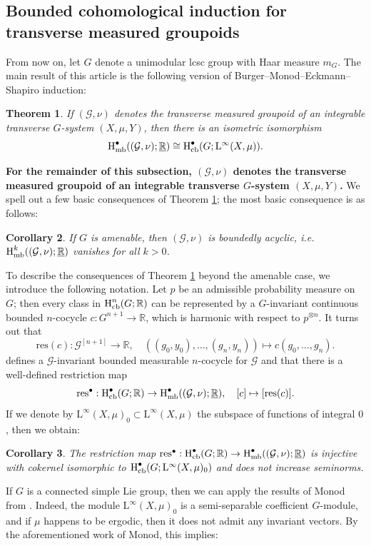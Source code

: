 \documentclass[11pt, oneside]{amsart}
\newtheorem{intro_thm}{Theorem}
\newtheorem{intro_cor}[intro_thm]{Corollary}
\theoremstyle{definition}
\theoremstyle{remark}
\theoremstyle{TheoremNum}
\newcommand{\Hmb}{\textup{H}_{\textup{mb}}}
\newcommand{\Hcb}{\textup{H}_{\textup{cb}}}
\newcommand{\Linf}{\mathrm{L}^{\infty}}
\newcommand{\cG}{\mathcal{G}}
\newcommand{\bR}{\mathbb{R}}
\begin{document}
\subsection{Bounded cohomological induction for transverse measured groupoids}
From now on, let $G$ denote a unimodular lcsc group with Haar measure $m_G$. The main result of this article is the following version of Burger--Monod--Eckmann--Shapiro induction:
\begin{intro_thm}\label{Induction} If $(\cG, \nu)$ denotes the transverse measured groupoid of an integrable transverse $G$-system $(X, \mu, Y)$, then there is an isometric isomorphism
\[
\Hmb^\bullet((\cG,\nu); \underline{\bR}) \cong \Hcb^\bullet(G; \Linf (X, \mu)).
\]
\end{intro_thm}
\textbf{For the remainder of this subsection, $(\cG, \nu)$ denotes the transverse measured groupoid of an integrable transverse $G$-system $(X, \mu, Y)$.} We spell out a few basic consequences of Theorem \ref{Induction}; the most basic consequence is as follows: 
\begin{intro_cor}\label{intro_cor_amenable} 
  If $G$ is amenable, then $(\cG, \nu)$ is boundedly acyclic, i.e. $\Hmb^k((\cG,\nu); \underline{\bR})$ vanishes for all $k > 0$. 
\end{intro_cor}
To describe the consequences of Theorem \ref{Induction} beyond the amenable case, we introduce the following notation. Let $p$ be an admissible probability measure on $G$; then every class in $\Hcb^n(G; \bR)$ can be represented by
a  $G$-invariant continuous bounded $n$-cocycle $c: G^{n+1} \to \bR$, which is harmonic with respect to $p^{\otimes n}$. It turns out that
\[
\mathrm{res}(c): \cG^{[n+1]} \to \bR, \quad ((g_0, y_0), \dots, (g_n, y_n)) \mapsto c(g_0, \dots, g_n).
\]
defines a $\cG$-invariant bounded measurable $n$-cocycle for $\cG$ and that there is a well-defined restriction map
\[
\mathrm{res}^\bullet: \Hcb^\bullet(G; \bR) \to \Hmb^\bullet((\cG,\nu); \underline{\bR}), \quad [c] \mapsto [\mathrm{res}(c)].
\]
If we denote by $\Linf (X, \mu)_0 \subset \Linf (X, \mu)$ the subspace of functions of integral $0$, then we obtain:
\begin{intro_cor}\label{intro_cor_seminorms}
   The restriction map $\mathrm{res}^\bullet:  \Hcb^\bullet(G; \bR) \to \Hmb^\bullet((\cG,\nu); \underline{\bR})$ is injective with cokernel isomorphic to $\Hcb^\bullet(G; \Linf (X, \mu)_0)$ and does not increase seminorms.
\end{intro_cor}
If $G$ is a connected simple Lie group, then we can apply the results of Monod from \cite{MonodSarithmetic}. Indeed, the module $\Linf(X, \mu)_0$ is a semi-separable coefficient $G$-module, and if $\mu$ happens to be ergodic, then it does not admit any invariant vectors. By the aforementioned work of Monod, this implies:
\end{document}
